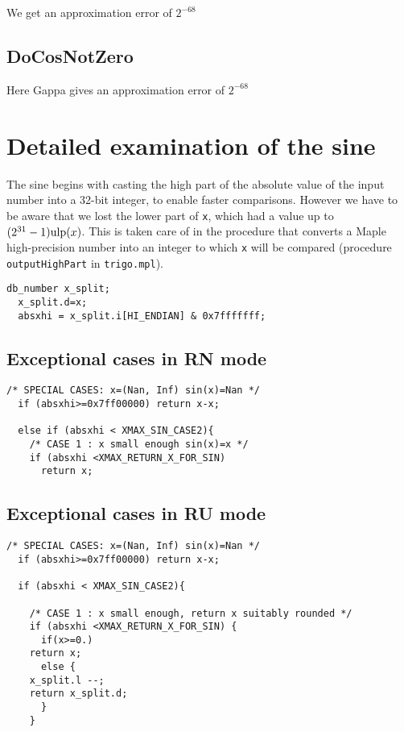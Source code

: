 We get an approximation error of $2^{-68}$

\subsection{DoCosNotZero}

Here Gappa gives  an approximation error of $2^{-68}$


\section{Detailed examination of the sine}

The sine begins with casting the high part of the absolute value of
the input number into a 32-bit integer, to enable faster comparisons.
However we have to be aware that we lost the lower part of \texttt{x},
which had a value up to $(2^{31}-1)\mbox{ulp}(x)$. This is taken care of in
the procedure that converts a Maple high-precision number into an
integer to which \texttt{x} will be compared (procedure
\texttt{outputHighPart} in \texttt{trigo.mpl}).

\begin{lstlisting}[caption={Casting to an int for faster comparisons},firstnumber=1]
  db_number x_split;
  x_split.d=x;
  absxhi = x_split.i[HI_ENDIAN] & 0x7fffffff;
\end{lstlisting}


\subsection{Exceptional cases in RN mode}
\begin{lstlisting}[caption={Exceptional cases for sine RN},firstnumber=1]
  /* SPECIAL CASES: x=(Nan, Inf) sin(x)=Nan */
  if (absxhi>=0x7ff00000) return x-x;    
   
  else if (absxhi < XMAX_SIN_CASE2){
    /* CASE 1 : x small enough sin(x)=x */
    if (absxhi <XMAX_RETURN_X_FOR_SIN)
      return x;
\end{lstlisting}

\subsection{Exceptional cases in RU mode}
\begin{lstlisting}[caption={Exceptional cases for sine RU},firstnumber=1]
  /* SPECIAL CASES: x=(Nan, Inf) sin(x)=Nan */
  if (absxhi>=0x7ff00000) return x-x;    
  
  if (absxhi < XMAX_SIN_CASE2){

    /* CASE 1 : x small enough, return x suitably rounded */
    if (absxhi <XMAX_RETURN_X_FOR_SIN) {
      if(x>=0.)
	return x;
      else {
	x_split.l --;
	return x_split.d;
      }
    }
\end{lstlisting}
